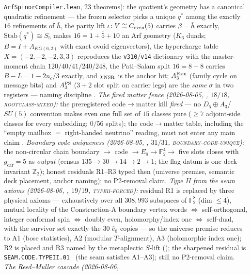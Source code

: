 \documentclass[11pt,a4paper]{article}
\newcommand{\gcar}{g_{\mathrm{car}}}
\newcommand{\Z}{\mathbb{Z}}
\theoremstyle{definition}
\begin{document}
\begin{winbox}
{\texttt{ArfSpinorCompiler.lean}, $23$ theorems):} the quotient's
geometry has a canonical quadratic refinement --- the frozen
selector picks a unique $q^{*}$ among the exactly $16$ refinements
of $\bar h$, the parity lift $\iota\colon V\cong C_{\rm even}(5)$
carries $\beta=\bar h$ exactly, $\mathrm{Stab}(q^{*})\cong S_5$
makes $16=1+\bar 5+10$ an Arf geometry ($K_6$ duads;
$B=I+A_{KG(6,2)}$ with exact ovoid eigenvectors), the hypercharge
table $X=(-2,-2,-2,3,3)$ reproduces the \texttt{v310}/\texttt{v14}
dictionary with the master-moment chain $120/40/41/240/248$, the
Pati--Salam split $16=8+8$ carries $B{-}L=1-2n_c/3$ exactly, and
$\chi_{\rm NSR}$ is the anchor bit; $A_3^{\rm Fam}$ (family cycle
on message bits) and $A_3^{\rm PS}$ ($3{+}2$ slot split on carrier
legs) are the \emph{same} $\sigma$ in two registers --- naming
discipline \mE.  \emph{The fired matter fence (2026-08-05,
, $18/18$,
\textsc{rootclass-mixed}):} the preregistered code$\to$matter kill
\emph{fired} --- no $D_5{\oplus}A_3$/$SU(5)$ convention makes even
one full set of $15$ classes pure ($\ge7$ adjoint-side classes for
every embedding; $0/56$ splits); the code$\to$matter table,
including the ``empty mailbox $=$ right-handed neutrino'' reading,
must not enter any main claim \mE.  \emph{Boundary code uniqueness
(2026-08-05, ,
$31/31$, \textsc{boundary-code-unique}):} the non-circular chain
boundary $\to$ code $\to E_8\to\mathbb F_2^4\to$ five slots closes
with $\gcar=5$ as \emph{output} (census $135\to30\to14\to2\to1$;
the flag datum is one deck-invariant $\Z_2$); honest residuals
R1--R3 typed then (universe premise, semantic deck placement,
anchor naming); no P2-removal claim.  \emph{Type II from the seam
axioms (2026-08-06, , $19/19$,
\textsc{typeii-forced}):} residual R1 is replaced by three physical
axioms --- exhaustively over all $308{,}993$ subspaces of
$\mathbb F_2^8$ (dim $\le4$), mutual locality of the
Construction-A boundary vertex words $\iff$ self-orthogonal,
integer conformal spin $\iff$ doubly even, holomorphy/index one
$\iff$ self-dual, with the survivor set exactly the $30$
$\hat e_8$ copies --- so the universe premise reduces to A1 (bose
statistics), A2 (modular $T$-alignment), A3 (holomorphic index
one); R2 is placed and R3 named by the metaplectic $S$-lift
(); the sharpened
residual is \texttt{SEAM.CODE.TYPEII.01} \mC\ (the seam satisfies
A1--A3); still no P2-removal claim.
\emph{The Reed--Muller cascade (2026-08-06,
}
\end{winbox}
\end{document}
